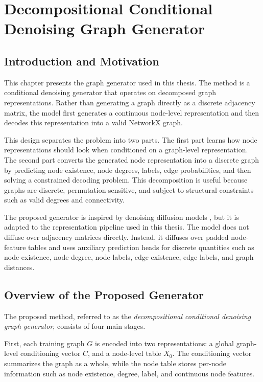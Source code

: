 \chapter{Decompositional Conditional Denoising Graph Generator}
\label{ch:generator}

\section{Introduction and Motivation}
\label{sec:generator:intro}

This chapter presents the graph generator used in this thesis. The method is a
conditional denoising generator that operates on decomposed graph
representations. Rather than generating a graph directly as a discrete adjacency
matrix, the model first generates a continuous node-level representation and
then decodes this representation into a valid NetworkX graph.

This design separates the problem into two parts. The first part learns how node
representations should look when conditioned on a graph-level representation.
The second part converts the generated node representation into a discrete graph
by predicting node existence, node degrees, labels, edge probabilities, and then
solving a constrained decoding problem. This decomposition is useful because
graphs are discrete, permutation-sensitive, and subject to structural
constraints such as valid degrees and connectivity.

The proposed generator is inspired by denoising diffusion models
\citep{ho2020ddpm,song2020score}, but it is adapted to the representation
pipeline used in this thesis. The model does not diffuse over adjacency matrices
directly. Instead, it diffuses over padded node-feature tables and uses auxiliary
prediction heads for discrete quantities such as node existence, node degree,
node labels, edge existence, edge labels, and graph distances.

\section{Overview of the Proposed Generator}
\label{sec:generator:overview}

The proposed method, referred to as the \emph{decompositional conditional
denoising graph generator}, consists of four main stages.

First, each training graph \(G\) is encoded into two representations: a global
graph-level conditioning vector \(C\), and a node-level table \(X_0\). The
conditioning vector summarizes the graph as a whole, while the node table stores
per-node information such as node existence, degree, label, and continuous node
features.

